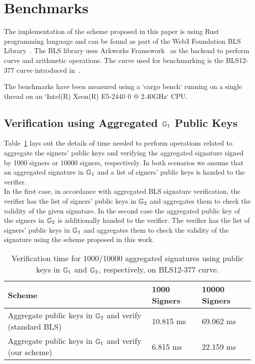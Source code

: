 \section{Benchmarks}
\label{sec:benchmarks}

The implementation of the scheme proposed in this paper is using Rust programming language and can be found as part of the Web3 Foundation BLS Library~\cite{web3.bls.2022}. 
The BLS library uses Arkworks Framework~\cite{arkworks.2022} as the backend to perform curve and arithmetic operations. The curve used for benchmarking is the BLS12-377 curve introduced in~\cite{bowe20_zexe}.

The benchmarks have been measured using a `cargo bench` running on a single thread on an `Intel(R) Xeon(R) E5-2440 0 @ 2.40GHz` CPU.

\subsection{Verification using Aggregated $\mathbb{G}_{1}$ Public Keys}
\label{sec:benchmark_aggregate_verify}

Table~\ref{tab:aggregated_signature_bench} lays out the details of time needed to perform operations related to aggregate the signers' public keys and verifying the aggregated signature signed by 1000 signers or 10000 
signers, respectively. In both scenarios we assume that an aggregated signature in $\mathbb{G}_{1}$ and a list of signers' public keys is handed to the verifier. \\

In the first case, in accordance with aggregated BLS signature verification, the verifier has the list of signers' public keys in $\mathbb{G}_{2}$ and aggregates them to check the validity of the given signature.
In the second case the aggregated public key of the signers in $\mathbb{G}_{2}$ is additionally handed to the verifier. The verifier has the list of signers' public keys in $\mathbb{G}_{1}$ and aggregates them to check the validity of the signature using the scheme proposed in this work.

\begin{table}[h!]
\begin{tabular}{| l | l | l |}

\hline

\textbf {Scheme} & \textbf {1000 Signers} & \textbf{10000 Signers} 	 \\
\hline
Aggregate public keys in $\mathbb{G}_{2}$ and verify (standard BLS) & 10.815 ms & 69.062 ms \\
\hline
Aggregate public keys in $\mathbb{G}_{1}$ and verify (our scheme)  & 6.815 ms & 22.159 ms \\
\hline
\end{tabular}
\caption{Verification time for 1000/10000 aggregated signatures using public keys in $\mathbb{G}_{1}$ and $\mathbb{G}_{2}$, respectively, on BLS12-377 curve.}
\label{tab:aggregated_signature_bench}
\end{table}

